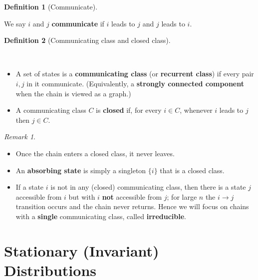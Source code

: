\documentclass[
  letterpaper,
  DIV=11,
  numbers=noendperiod]{scrreprt}
\providecommand{\tightlist}{%
  \setlength{\itemsep}{0pt}\setlength{\parskip}{0pt}}
\theoremstyle{definition}
\newtheorem{definition}{Definition}[chapter]
\theoremstyle{plain}
\theoremstyle{plain}
\theoremstyle{definition}
\theoremstyle{plain}
\theoremstyle{plain}
\theoremstyle{remark}
\newtheorem*{remark}{Remark}
\begin{document}
\begin{definition}[Communicate]\protect\hypertarget{def-communicate}{}\label{def-communicate}

We say \(i\) and \(j\) \textbf{communicate} if \(i\) leads to \(j\) and
\(j\) leads to \(i\).

\end{definition}

\begin{definition}[Communicating class and closed
class]\protect\hypertarget{def-classes}{}\label{def-classes}

~

\begin{itemize}
\tightlist
\item
  A set of states is a \textbf{communicating class} (or
  \textbf{recurrent class}) if every pair \(i, j\) in it communicate.
  (Equivalently, a \textbf{strongly connected component} when the chain
  is viewed as a graph.)
\item
  A communicating class \(C\) is \textbf{closed} if, for every
  \(i \in C\), whenever \(i\) leads to \(j\) then \(j \in C\).
\end{itemize}

\end{definition}

\begin{remark}
\leavevmode

\begin{itemize}
\tightlist
\item
  Once the chain enters a closed class, it never leaves.
\item
  An \textbf{absorbing state} is simply a singleton \(\{i\}\) that is a
  closed class.
\item
  If a state \(i\) is not in any (closed) communicating class, then
  there is a state \(j\) accessible from \(i\) but with \(i\)
  \textbf{not} accessible from \(j\); for large \(n\) the \(i \to j\)
  transition occurs and the chain never returns. Hence we will focus on
  chains with a \textbf{single} communicating class, called
  \textbf{irreducible}.
\end{itemize}

\end{remark}

\section{Stationary (Invariant)
Distributions}\label{stationary-invariant-distributions}
\end{document}
